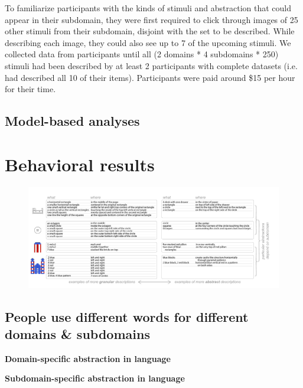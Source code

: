 \documentclass[10pt,letterpaper]{article}
\begin{document}
To familiarize participants with the kinds of stimuli and abstraction that could appear in their subdomain, they were first required to click through images of 25 other stimuli from their subdomain, disjoint with the set to be described. 
While describing each image, they could also see up to 7 of the upcoming stimuli.
We collected data from participants until all (2 domains * 4 subdomains * 250) stimuli had been described by at least 2 participants with complete datasets (i.e. had described all 10 of their items).
Participants were paid around \$15 per hour for their time. 


\subsection{Model-based analyses}




\section{Behavioral results} 

\begin{figure}
  \begin{center}
  \includegraphics[width=0.99\linewidth]{figures/instruction_examples.pdf}
  \caption{}
  \label{fig:intruction_examples}
  \end{center}
  \end{figure}

\subsection{People use different words for different domains & subdomains} 

\par \textbf{Domain-specific abstraction in language}

\par \textbf{Subdomain-specific abstraction in language}
\end{document}
